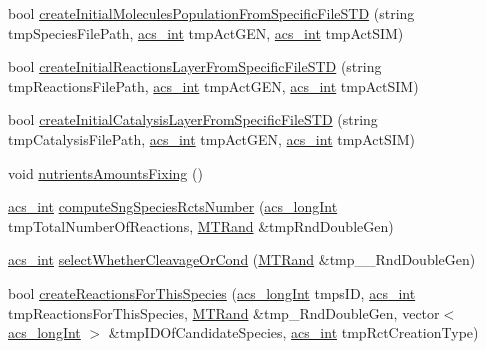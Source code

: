 \begin{DoxyCompactItemize}
\item 
bool \hyperlink{classenvironment_aa70e1394bf2240f6e5f14d4cbf369a3b}{create\-Initial\-Molecules\-Population\-From\-Specific\-File\-S\-T\-D} (string tmp\-Species\-File\-Path, \hyperlink{acs__headers_8h_a8d277355641a098190360234e2ebde35}{acs\-\_\-int} tmp\-Act\-G\-E\-N, \hyperlink{acs__headers_8h_a8d277355641a098190360234e2ebde35}{acs\-\_\-int} tmp\-Act\-S\-I\-M)
\item 
bool \hyperlink{classenvironment_a743956229b11d7860dbc89a18f869586}{create\-Initial\-Reactions\-Layer\-From\-Specific\-File\-S\-T\-D} (string tmp\-Reactions\-File\-Path, \hyperlink{acs__headers_8h_a8d277355641a098190360234e2ebde35}{acs\-\_\-int} tmp\-Act\-G\-E\-N, \hyperlink{acs__headers_8h_a8d277355641a098190360234e2ebde35}{acs\-\_\-int} tmp\-Act\-S\-I\-M)
\item 
bool \hyperlink{classenvironment_a6dd31bae82367ebe7d6a6bb062b8cd07}{create\-Initial\-Catalysis\-Layer\-From\-Specific\-File\-S\-T\-D} (string tmp\-Catalysis\-File\-Path, \hyperlink{acs__headers_8h_a8d277355641a098190360234e2ebde35}{acs\-\_\-int} tmp\-Act\-G\-E\-N, \hyperlink{acs__headers_8h_a8d277355641a098190360234e2ebde35}{acs\-\_\-int} tmp\-Act\-S\-I\-M)
\item 
void \hyperlink{classenvironment_a9ceec5e00b0f5a51dd125c583b8ac5ec}{nutrients\-Amounts\-Fixing} ()
\item 
\hyperlink{acs__headers_8h_a8d277355641a098190360234e2ebde35}{acs\-\_\-int} \hyperlink{classenvironment_a0fd3cb062d35d2f6dd8961e95dd477b7}{compute\-Sng\-Species\-Rcts\-Number} (\hyperlink{acs__headers_8h_a19319d75f02db4308bc5c0026d98cd85}{acs\-\_\-long\-Int} tmp\-Total\-Number\-Of\-Reactions, \hyperlink{class_m_t_rand}{M\-T\-Rand} \&tmp\-Rnd\-Double\-Gen)
\item 
\hyperlink{acs__headers_8h_a8d277355641a098190360234e2ebde35}{acs\-\_\-int} \hyperlink{classenvironment_a53282cca8882e86652ab0a22e6966d17}{select\-Whether\-Cleavage\-Or\-Cond} (\hyperlink{class_m_t_rand}{M\-T\-Rand} \&tmp\-\_\-\-\_\-\-Rnd\-Double\-Gen)
\item 
bool \hyperlink{classenvironment_a76794f37d6d94b7504c58f0f4a4709ca}{create\-Reactions\-For\-This\-Species} (\hyperlink{acs__headers_8h_a19319d75f02db4308bc5c0026d98cd85}{acs\-\_\-long\-Int} tmps\-I\-D, \hyperlink{acs__headers_8h_a8d277355641a098190360234e2ebde35}{acs\-\_\-int} tmp\-Reactions\-For\-This\-Species, \hyperlink{class_m_t_rand}{M\-T\-Rand} \&tmp\-\_\-\-Rnd\-Double\-Gen, vector$<$ \hyperlink{acs__headers_8h_a19319d75f02db4308bc5c0026d98cd85}{acs\-\_\-long\-Int} $>$ \&tmp\-I\-D\-Of\-Candidate\-Species, \hyperlink{acs__headers_8h_a8d277355641a098190360234e2ebde35}{acs\-\_\-int} tmp\-Rct\-Creation\-Type)

\end{DoxyCompactItemize}
